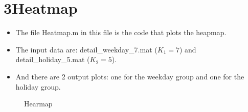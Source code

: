 \documentclass{article}
\begin{document}
\section{3Heatmap}
\begin{itemize}
	\item The file Heatmap.m in this file is the code that plots the heapmap.
	\item The input data are: detail\_weekday\_7.mat ($K_1=7$) and	detail\_holiday\_5.mat ($K_2=5$).
	\item And there are 2 output plots: one for the weekday group and one for the holiday group.
\end{itemize}
\begin{figure}[h!]
	\begin{center}
		\vspace{-0.3in}
		\caption{Hearmap}%
	\end{center}
\end{figure}
\end{document}
